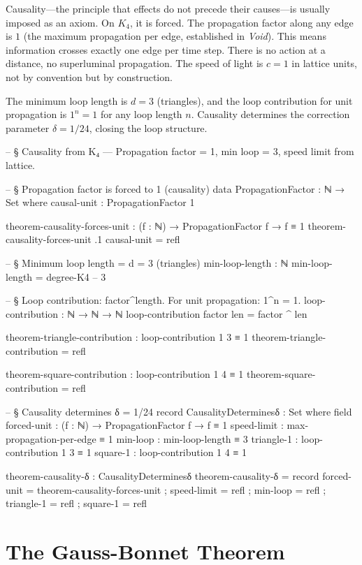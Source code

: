 \documentclass[11pt,a4paper]{book}
\begin{document}
Causality---the principle that effects do not precede their causes---is usually imposed as an axiom. On $K_4$, it is forced. The propagation factor along any edge is $1$ (the maximum propagation per edge, established in \textit{Void}). This means information crosses exactly one edge per time step. There is no action at a distance, no superluminal propagation. The speed of light is $c = 1$ in lattice units, not by convention but by construction.

The minimum loop length is $d = 3$ (triangles), and the loop contribution for unit propagation is $1^n = 1$ for any loop length $n$. Causality determines the correction parameter $\delta = 1/24$, closing the loop structure.

\begin{code}
-- § Causality from K₄ — Propagation factor = 1, min loop = 3, speed limit from lattice.

-- § Propagation factor is forced to 1 (causality)
data PropagationFactor : ℕ → Set where
  causal-unit : PropagationFactor 1

theorem-causality-forces-unit : (f : ℕ) → PropagationFactor f → f ≡ 1
theorem-causality-forces-unit .1 causal-unit = refl

-- § Minimum loop length = d = 3 (triangles)
min-loop-length : ℕ
min-loop-length = degree-K4  -- 3

-- § Loop contribution: factor^length. For unit propagation: 1^n = 1.
loop-contribution : ℕ → ℕ → ℕ
loop-contribution factor len = factor ^ len

theorem-triangle-contribution : loop-contribution 1 3 ≡ 1
theorem-triangle-contribution = refl

theorem-square-contribution : loop-contribution 1 4 ≡ 1
theorem-square-contribution = refl

-- § Causality determines δ = 1/24
record CausalityDeterminesδ : Set where
  field
    forced-unit : (f : ℕ) → PropagationFactor f → f ≡ 1
    speed-limit : max-propagation-per-edge ≡ 1
    min-loop    : min-loop-length ≡ 3
    triangle-1  : loop-contribution 1 3 ≡ 1
    square-1    : loop-contribution 1 4 ≡ 1

theorem-causality-δ : CausalityDeterminesδ
theorem-causality-δ = record
  { forced-unit = theorem-causality-forces-unit
  ; speed-limit = refl
  ; min-loop    = refl
  ; triangle-1  = refl
  ; square-1    = refl }
\end{code}

\section{The Gauss-Bonnet Theorem}
\label{sec:gauss-bonnet}
\end{document}
